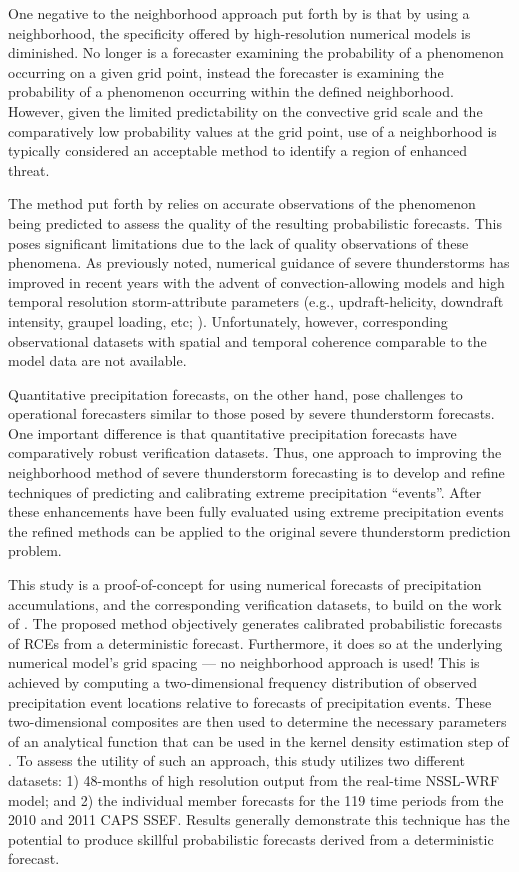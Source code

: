 One negative to the neighborhood approach put forth by \cite{Sobash2011} is that by using a neighborhood, the specificity offered by high-resolution numerical models is diminished.
No longer is a forecaster examining the probability of a phenomenon occurring on a given grid point, instead the forecaster is examining the probability of a phenomenon occurring within the defined neighborhood.
However, given the limited predictability on the convective grid scale and the comparatively low probability values at the grid point, use of a neighborhood is typically considered an acceptable method to identify a region of enhanced threat.


The method put forth by \cite{Sobash2011} relies on accurate observations of the phenomenon being predicted to assess the quality of the resulting probabilistic forecasts.
This poses significant limitations due to the lack of quality observations of these phenomena.
As previously noted, numerical guidance of severe thunderstorms has improved in recent years with the advent of convection-allowing models and high temporal resolution storm-attribute parameters (e.g., updraft-helicity, downdraft intensity, graupel loading, etc; \citealp{Kain2010}).
Unfortunately, however, corresponding observational datasets with spatial and temporal coherence comparable to the model data are not available.


Quantitative precipitation forecasts, on the other hand, pose challenges to operational forecasters similar to those posed by severe thunderstorm forecasts.
One important difference is that quantitative precipitation forecasts have comparatively robust verification datasets.
Thus, one approach to improving the neighborhood method of severe thunderstorm forecasting is to develop and refine techniques of predicting and calibrating extreme precipitation ``events''.
After these enhancements have been fully evaluated using extreme precipitation events the refined methods can be applied to the original severe thunderstorm prediction problem.


This study is a proof-of-concept for using numerical forecasts of precipitation accumulations, and the corresponding verification datasets, to build on the work of \cite{Sobash2011}.
The proposed method objectively generates calibrated probabilistic forecasts of RCEs from a deterministic forecast.
Furthermore, it does so at the underlying numerical model's grid spacing --- no neighborhood approach is used!
This is achieved by computing a two-dimensional frequency distribution of observed precipitation event locations relative to forecasts of precipitation events.
These two-dimensional composites are then used to determine the necessary parameters of an analytical function that can be used in the kernel density estimation step of \cite{Sobash2011}.
To assess the utility of such an approach, this study utilizes two different datasets: 1) 48-months of high resolution output from the real-time NSSL-WRF model; and 2) the individual member forecasts for the 119 time periods from the 2010 and 2011 CAPS SSEF.
Results generally demonstrate this technique has the potential to produce skillful probabilistic forecasts derived from a deterministic forecast.


